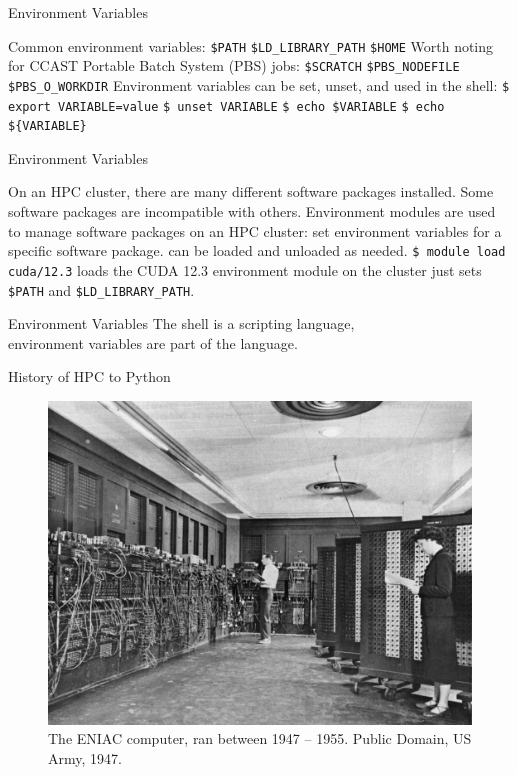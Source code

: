 \documentclass[aspectratio=169]{beamer}
\begin{document}
    \begin{frame}{Environment Variables}
        \begin{outline}
            \1 Common environment variables:
                \2 \texttt{\$PATH} 
                \2 \texttt{\$LD\_LIBRARY\_PATH} 
                \2 \texttt{\$HOME} 
            \1 Worth noting for CCAST Portable Batch System (PBS) jobs: 
                \2 \texttt{\$SCRATCH} 
                \2 \texttt{\$PBS\_NODEFILE}
                \2 \texttt{\$PBS\_O\_WORKDIR}
            \1 Environment variables can be set, unset, and used in the shell:
                \2 \texttt{\$ export VARIABLE=value}
                \2 \texttt{\$ unset VARIABLE} 
                \2 \texttt{\$ echo \$VARIABLE}
                \2 \texttt{\$ echo \$\{VARIABLE\}}
        \end{outline}
    \end{frame}

    \begin{frame}{Environment Variables}
        \begin{outline}
            \1 On an HPC cluster, there are many different software packages installed. 
                \2 Some software packages are incompatible with others.
            \1 Environment modules are used to manage software packages on an HPC cluster:
                \2 set environment variables for a specific software package.
                \2 can be loaded and unloaded as needed.
            \0 \texttt{\$ module load cuda/12.3} 
                \1 loads the CUDA 12.3 environment module on the cluster
                \1 just sets \texttt{\$PATH} and \texttt{\$LD\_LIBRARY\_PATH}.
        \end{outline}
    \end{frame}

    \begin{frame}{Environment Variables}
        \centering
        \Huge The shell is a scripting language,\\
        environment variables are part of the language.
    \end{frame}

    \begin{frame}{History of HPC to Python}
        \begin{figure}[H]
            \centering
            \includegraphics[width=0.50\linewidth]{ENIAC.jpg}
            \caption{The ENIAC computer, ran between 1947 -- 1955. \ccLogo Public Domain, US Army, 1947.}
        \end{figure}
    \end{frame}
    
\end{document}
